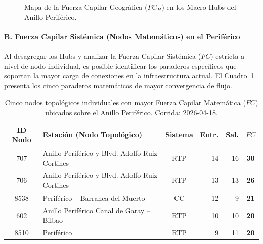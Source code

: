 \begin{figure}[H]
    \centering
    \caption[Distribución espacial de Macro-Hubs en el Periférico]{Mapa de la
    Fuerza Capilar Geográfica ($FC_H$) en los Macro-Hubs del Anillo Periférico.}
    \label{fig:mapa-hubs-periferico}
\end{figure}

\paragraph{B. Fuerza Capilar Sistémica (Nodos Matemáticos) en el Periférico}

Al desagregar los Hubs y analizar la Fuerza Capilar Sistémica ($FC$) estricta a
nivel de nodo individual, es posible identificar los paraderos específicos que
soportan la mayor carga de conexiones en la infraestructura actual. El
Cuadro~\ref{tab:periferico-nodos-math} presenta los cinco paraderos matemáticos
de mayor convergencia de flujo.

\begin{table}[H]
    \centering
    \caption[Nodos con mayor Fuerza Capilar Sistémica sobre el Eje Periférico]{
    Cinco nodos topológicos individuales con mayor Fuerza Capilar Matemática
    ($FC$) ubicados sobre el Anillo Periférico. Corrida: 2026-04-18.}
    \label{tab:periferico-nodos-math}
    \fontsize{9.5pt}{11.5pt}\selectfont
    \begin{tabular}{|c|l|c|r|r|c|}
        \hline
        \textbf{ID Nodo} & \textbf{Estación (Nodo Topológico)} & \textbf{Sistema} & \textbf{Entr.} & \textbf{Sal.} & \textbf{$FC$} \\
        \hline
        707  & Anillo Periférico y Blvd. Adolfo Ruiz Cortines & RTP & 14 & 16 & \textbf{30} \\
        \hline
        706  & Anillo Periférico y Blvd. Adolfo Ruiz Cortines & RTP & 13 & 13 & \textbf{26} \\
        \hline
        8538 & Periférico -- Barranca del Muerto              &  CC & 12 &  9 & \textbf{21} \\
        \hline
        602  & Anillo Periférico Canal de Garay -- Bilbao     & RTP & 10 & 10 & \textbf{20} \\
        \hline
        8510 & Periférico                                     & RTP &  9 & 11 & \textbf{20} \\
        \hline
    \end{tabular}
    \vspace{1ex}
\end{table}

